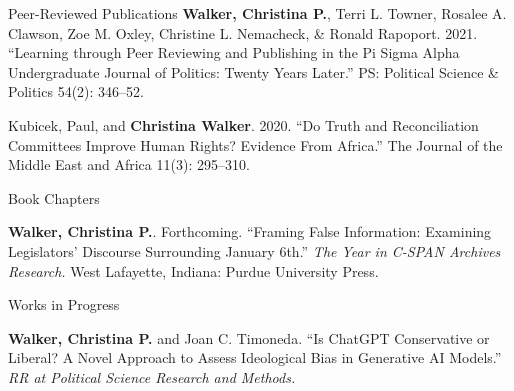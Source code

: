 \documentclass{resume} %
\begin{document}
\begin{rSection}{Peer-Reviewed Publications}
\textbf{Walker, Christina P.}, Terri L. Towner, Rosalee A. Clawson, Zoe M. Oxley, Christine L. Nemacheck, \& Ronald Rapoport. 2021. “Learning through Peer Reviewing and Publishing in the Pi Sigma Alpha Undergraduate Journal of Politics: Twenty Years Later.” PS: Political Science \& Politics 54(2): 346–52. \href{https://www.cambridge.org/core/journals/ps-political-science-and-politics/article/learning-through-peer-reviewing-and-publishing-in-the-pi-sigma-alpha-undergraduate-journal-of-politics-twenty-years-later/CF2910FBB8C381BAFEBE32A663D21172}{}

Kubicek, Paul, and \textbf{Christina Walker}. 2020. “Do Truth and Reconciliation Committees Improve Human Rights? Evidence From Africa.” The Journal of the Middle East and Africa 11(3): 295–310. \href{https://www.tandfonline.com/doi/abs/10.1080/21520844.2020.1808401}{}

\end{rSection}

\begin{rSection}{Book Chapters}

\textbf{Walker, Christina P.}. Forthcoming. “Framing False Information: Examining Legislators' Discourse Surrounding January 6th.” \textit{The Year in C-SPAN Archives Research.} West Lafayette, Indiana: Purdue University Press.

\end{rSection}

\begin{rSection}{Works in Progress}

\textbf{Walker, Christina P.} and Joan C. Timoneda. “Is ChatGPT Conservative or Liberal? A Novel Approach to Assess Ideological Bias in Generative AI Models.” \textit{RR at Political Science Research and Methods.}

\end{rSection}






\end{document}
